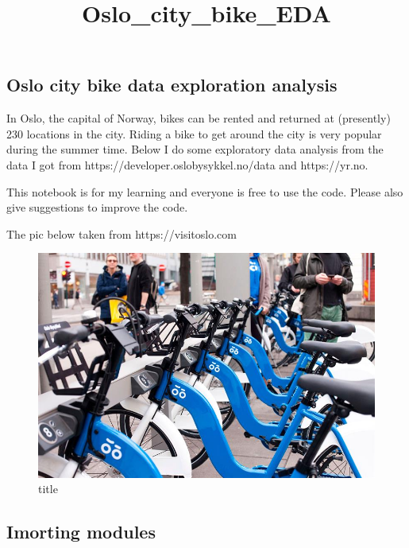 \documentclass[11pt]{article}
\title{Oslo\_city\_bike\_EDA}
\makeatletter
\def\maxwidth{\ifdim\Gin@nat@width>\linewidth\linewidth
    \else\Gin@nat@width\fi}
\let\Oldincludegraphics\includegraphics
\renewcommand{\includegraphics}[1]{\Oldincludegraphics[width=.8\maxwidth]{#1}}
\makeatother
\begin{document}
    
    
    \maketitle
    
    

    
    \subsection{Oslo city bike data exploration
analysis}\label{oslo-city-bike-data-exploration-analysis}

    In Oslo, the capital of Norway, bikes can be rented and returned at
(presently) 230 locations in the city. Riding a bike to get around the
city is very popular during the summer time. Below I do some exploratory
data analysis from the data I got from
https://developer.oslobysykkel.no/data and https://yr.no.

This notebook is for my learning and everyone is free to use the code.
Please also give suggestions to improve the code.

The pic below taken from https://visitoslo.com

    \begin{figure}
\centering
\includegraphics{bike_pic.jpeg}
\caption{title}
\end{figure}

    \subsection{Imorting modules}\label{imorting-modules}
\end{document}

